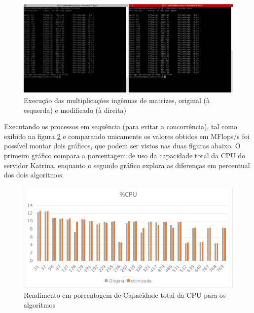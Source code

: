 \documentclass[a4paper,10pt]{article}
\begin{document}
\begin{figure}[H]
    \begin{center} 
        \includegraphics[scale=0.33]{images/exec_comp}
    \end{center}
    \caption{Execução das multiplicações ingênuas de matrizes, original (à esquerda) e modificado (à direita)}
    \label{fig:comp}
\end{figure}

Executando os processos em sequência (para evitar a concorrência), tal como exibido na figura \ref{fig:comp} e comparando unicamente os valores obtidos em MFlops/s foi possível montar dois gráficos, que podem ser vistos nas duas figuras abaixo. O primeiro gráfico compara a porcentagem de uso da capacidade total da CPU do servidor Katrina, enquanto o segundo gráfico explora as diferenças em percentual dos dois algoritmos.


\begin{figure}[H]
    \begin{center} 
        \includegraphics[scale=0.6]{images/grafico2_1}
    \end{center}
    \caption{Rendimento em porcentagem de Capacidade total da CPU para os algoritmos}
    \label{fig:comp}
\end{figure}
\end{document}
